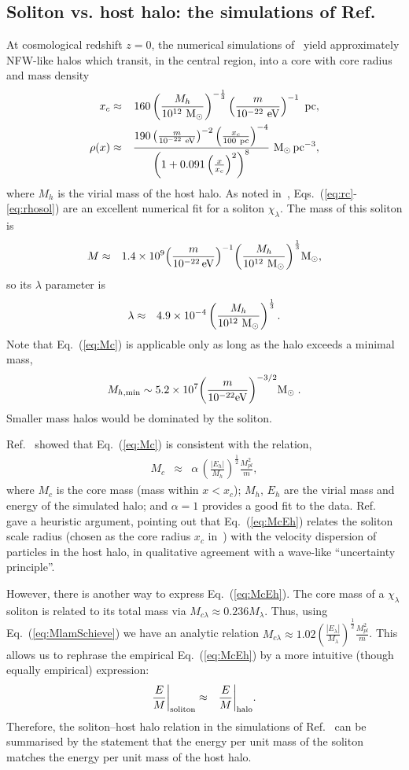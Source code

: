 \documentclass[aps,prd,floats,superscriptaddress,showpacs,nofootinbib,twocolumn,preprintnumbers]{revtex4-1}%
\def\be{\begin{eqnarray}}
\def\ee{\end{eqnarray}}
\begin{document}
\subsection{Soliton vs. host halo: the simulations of Ref.~\cite{Schive:2014hza,Schive:2014dra}}\label{ss:Schive}
% 
%
At cosmological redshift $z=0$, the numerical simulations of~\cite{Schive:2014hza,Schive:2014dra} yield approximately NFW-like halos which transit, in the central region, into a core with core radius and mass density
%
\be x_c&\approx&160\left(\frac{M_h}{10^{12}~{\rm M_\odot}}\right)^{-\frac{1}{3}}\left(\frac{m}{\rm10^{-22}~eV}\right)^{-1}~{\rm pc},\label{eq:rc}\\
%
\rho(x)&\approx&\frac{190\left(\frac{m}{10^{-22}~\rm eV}\right)^{-2}\left(\frac{x_c}{100~\rm pc}\right)^{-4}}{\left(1+0.091\left(\frac{x}{x_c}\right)^2\right)^8}~{\rm M_{\odot}\,pc^{-3}},\label{eq:rhosol}
\ee
%
where $M_h$ is the virial mass of the host halo. 
%
As noted in~\cite{Schive:2014hza,Schive:2014dra,Marsh:2015wka}, Eqs.~(\ref{eq:rc}-\ref{eq:rhosol}) are an excellent numerical fit for a soliton $\chi_\lambda$. The mass of this soliton is 
%
\be\label{eq:Mc} M&\approx&1.4\times10^9\!
\left(\frac{m}{10^{-22}\,\rm eV}\right)^{-1}
\!\left(\frac{M_h}{10^{12}~{\rm M_\odot}}\right)^{\frac{1}{3}}
\!{\rm M_{\odot}},\ee
% 
so its $\lambda$ parameter is
%
\be\label{eq:lamsim}\lambda&\approx&4.9\times10^{-4}\left(\frac{M_h}{10^{12}~{\rm M_\odot}}\right)^{\frac{1}{3}}.\ee
%
Note that Eq.~(\ref{eq:Mc}) is applicable only as long as the halo
exceeds a minimal mass,
\be
\label{eq:minMh}
M_{h,{\rm min}}\sim 5.2\times
10^7\bigg(\frac{m}{10^{-22}{\rm eV}}\bigg)^{-3/2}
{\rm M}_\odot\;.
\ee
Smaller mass halos would be dominated by the soliton. 

Ref.~\cite{Schive:2014hza} showed that Eq.~(\ref{eq:Mc}) is consistent
with the relation, 
%
\be\label{eq:McEh}
M_c&\approx&\alpha\,\left(\frac{|E_h|}{M_h}\right)^{\frac{1}{2}}\frac{M_{pl}^2}{m},\ee 
%
where $M_{c}$ is the core mass (mass within $x<x_c$); $M_h,\,E_h$ are
the virial mass and energy of the simulated halo; and $\alpha=1$
provides a good fit to the data. Ref.~\cite{Schive:2014hza} gave a
heuristic argument, pointing out that Eq.~(\ref{eq:McEh}) relates
the soliton scale radius (chosen as the core radius $x_c$
in~\cite{Schive:2014hza}) with the velocity dispersion of particles in the
host halo, in qualitative agreement with a wave-like ``uncertainty
principle''. 

However, there is another way to express Eq.~(\ref{eq:McEh}). The core
mass of a $\chi_\lambda$ soliton is related to its total mass via
$M_{c\lambda}\approx0.236M_\lambda$. Thus, using
Eq.~(\ref{eq:MlamSchieve}) we have an analytic relation
$M_{c\lambda}\approx1.02\left(\frac{|E_\lambda|}{M_\lambda}\right)^{\frac{1}{2}}\frac{M_{pl}^2}{m}$.  
%
This allows us to rephrase the empirical
Eq.~(\ref{eq:McEh}) by a more intuitive (though equally empirical)
expression: 
%
\be\label{eq:E2MsolE2Mh} \frac{E}{M}\bigg|_{\rm
  soliton}&\approx&\frac{E}{M}\bigg|_{\rm halo}.
\ee 
%
Therefore, the soliton--host halo relation in the simulations of
Ref.~\cite{Schive:2014hza,Schive:2014dra} can be summarised by the
statement that the energy per unit mass of the soliton matches the
energy per unit mass of the host halo.   
\end{document}
